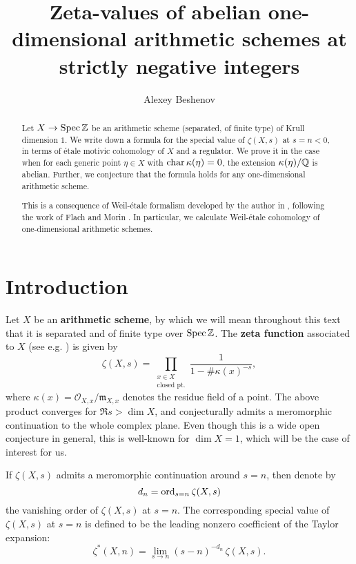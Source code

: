 \documentclass[draft]{article}
\title{Zeta-values of abelian one-dimensional arithmetic schemes at strictly
  negative integers} \author{Alexey Beshenov}
\numberwithin{equation}{section}
\begin{document}
\maketitle

\begin{abstract}
  Let $X \to \operatorname{Spec} \mathbb{Z}$ be an arithmetic scheme (separated, of finite type) of
  Krull dimension $1$. We write down a formula for the special value of
  $\zeta (X,s)$ at $s = n < 0$, in terms of \'{e}tale motivic cohomology of $X$ and
  a regulator. We prove it in the case when for each generic point $\eta \in X$
  with $\operatorname{char} \kappa (\eta) = 0$, the extension $\kappa (\eta)/\mathbb{Q}$ is
  abelian. Further, we conjecture that the formula holds for any one-dimensional
  arithmetic scheme.

  This is a consequence of Weil-\'{e}tale formalism developed by the author in
  \cite{Beshenov-Weil-etale-1,Beshenov-Weil-etale-2}, following the work of
  Flach and Morin \cite{Flach-Morin-2018}. In particular, we calculate
  Weil-\'{e}tale cohomology of one-dimensional arithmetic schemes.
\end{abstract}

\tableofcontents


\section{Introduction}

Let $X$ be an \textbf{arithmetic scheme}, by which we will mean throughout this
text that it is separated and of finite type over $\operatorname{Spec} \mathbb{Z}$.
The \textbf{zeta function} associated to $X$ (see e.g. \cite{Serre-1965}) is
given by
\[ \zeta (X,s) = \prod_{\substack{x \in X \\ \text{closed pt.}}}
  \frac{1}{1 - \#\kappa (x)^{-s}}, \]
where $\kappa (x) = \mathcal{O}_{X,x}/\mathfrak{m}_{X,x}$ denotes the residue
field of a point. The above product converges for $\Re s > \dim X$, and
conjecturally admits a meromorphic continuation to the whole complex plane.
Even though this is a wide open conjecture in general, this is well-known for
$\dim X = 1$, which will be the case of interest for us.

If $\zeta (X,s)$ admits a meromorphic continuation around $s = n$, then denote
by
\begin{equation}
  \label{eqn:vanishing-order}
  d_n = \operatorname{ord}_{s=n} \zeta (X,s)
\end{equation}
the vanishing order of $\zeta (X,s)$ at $s = n$. The corresponding special value
of $\zeta (X,s)$ at $s = n$ is defined to be the leading nonzero coefficient of
the Taylor expansion:
$$\zeta^* (X,n) = \lim_{s \to n} (s - n)^{-d_n}\,\zeta (X,s).$$
\end{document}
